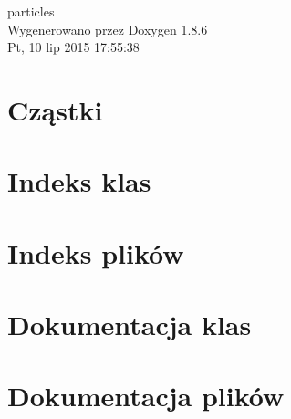 \documentclass[twoside]{book}
\newcommand{\clearemptydoublepage}{%
  \newpage{\pagestyle{empty}\cleardoublepage}%
}
\begin{document}
\hypersetup{pageanchor=false}
\begin{titlepage}
\vspace*{7cm}
\begin{center}%
{\Large particles }\\
\vspace*{1cm}
{\large Wygenerowano przez Doxygen 1.8.6}\\
\vspace*{0.5cm}
{\small Pt, 10 lip 2015 17:55:38}\\
\end{center}
\end{titlepage}
\clearemptydoublepage
\tableofcontents
\clearemptydoublepage
{}
\hypersetup{pageanchor=true}

\chapter{Cząstki}
\label{index}\hypertarget{index}{}
\chapter{Indeks klas}

\chapter{Indeks plików}

\chapter{Dokumentacja klas}





\chapter{Dokumentacja plików}

























\newpage
{}
{}
\printindex
\end{document}
